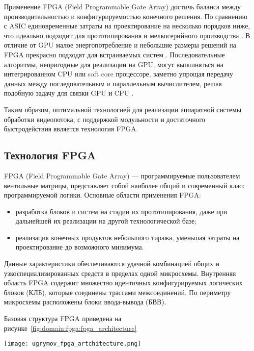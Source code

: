 Применение FPGA (Field Programmable Gate Array) достичь баланса между производительностью и конфигурируемостью конечного решения.
По сравнению с ASIC единовременные затраты на проектирование на несколько порядков ниже,
что идеально подходит для прототипирования и мелкосерийного производства \cite{zuchowski_asic_vs_fpga_cost}.
В отличие от GPU малое энергопотребление и небольшие размеры решений на FPGA прекрасно подходят
для встраиваемых систем \cite{berten_gpu_fpga_comparison}.
Последовательные алгоритмы, непригодные для реализации на GPU, могут выполняться
на интегрированном CPU или soft core процессоре, заметно упрощая передачу данных
между последовательным и параллельным вычислителем, решая подобную задачу
для связки GPU и CPU \cite{russo_softcore_fpga_vs_gpu}.

Таким образом, оптимальной технологией для реализации аппаратной системы обработки видеопотока,
с поддержкой модульности и достаточного быстродействия является технология FPGA.


\subsection{Технология FPGA}
\label{sub:domain:fpga}

FPGA (Field Programmable Gate Array) --- программируемые пользователем вентильные матрицы,
представляет собой наиболее общий и современный класс программируемой логики.
Основные области применения FPGA:
\begin{itemize}
  \item разработка блоков и систем на стадии их прототипирования, даже при дальнейшей их реализации на другой технологической базе;
  \item реализация конечных продуктов небольшого тиража, уменьшая затраты на проектирование до возможного минимума.
\end{itemize}

Данные характеристики обеспечиваются удачной комбинацией общих и узкоспециализированных средств
в пределах одной микросхемы. Внутренняя область FPGA содержит множество идентичных конфигурируемых логических блоков (КЛБ),
которые соединены трассами межсоединений. По периметру микросхемы расположены блоки ввода-вывода (БВВ).

Базовая структура FPGA приведена на рисунке~\ref{fig:domain:fpga:fpga_architecture}

\begin{center}
  \centering
  \texttt{[image: ugrymov\_fpga\_artchitecture.png]}
  \label{fig:domain:fpga:fpga_architecture}
\end{center}

